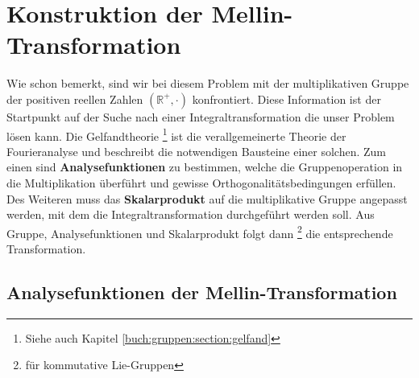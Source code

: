 %
%
%

\section{Konstruktion der Mellin-Transformation
\label{mellin:section:teil2}}
Wie schon bemerkt, sind wir bei diesem Problem mit der multiplikativen Gruppe der positiven reellen Zahlen $(\mathbb{R^+},\cdot)$ 
konfrontiert. 
Diese Information ist der Startpunkt auf der Suche nach einer Integraltransformation die unser Problem lösen kann.
Die Gelfandtheorie \footnote{Siehe auch Kapitel \ref{buch:gruppen:section:gelfand}} ist die verallgemeinerte Theorie der Fourieranalyse und beschreibt die notwendigen Bausteine einer solchen.
Zum einen sind \textbf{Analysefunktionen} zu bestimmen, welche die Gruppenoperation in die Multiplikation überführt und gewisse 
Orthogonalitätsbedingungen erfüllen. 
Des Weiteren muss das \textbf{Skalarprodukt} auf die multiplikative Gruppe angepasst werden, mit dem die Integraltransformation durchgeführt 
werden soll.
Aus Gruppe, Analysefunktionen und Skalarprodukt folgt dann \footnote{für kommutative Lie-Gruppen} die entsprechende Transformation.






\subsection{Analysefunktionen der Mellin-Transformation
\label{mellin:subsection:analysefunktionen}}

